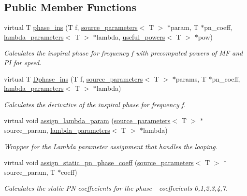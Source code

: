 \subsection*{Public Member Functions}
\begin{DoxyCompactItemize}
\item 
virtual T \hyperlink{classgIMRPhenomD_a7f4ebb4ae13d1038a437f86862f6dce1}{phase\+\_\+ins} (T f, \hyperlink{structsource__parameters}{source\+\_\+parameters}$<$ T $>$ $\ast$param, T $\ast$pn\+\_\+coeff, \hyperlink{structlambda__parameters}{lambda\+\_\+parameters}$<$ T $>$ $\ast$lambda, \hyperlink{structuseful__powers}{useful\+\_\+powers}$<$ T $>$ $\ast$pow)
\begin{DoxyCompactList}\small\item\em Calculates the inspiral phase for frequency f with precomputed powers of MF and PI for speed. \end{DoxyCompactList}\item 
virtual T \hyperlink{classgIMRPhenomD_a6099474bc9029be687ff6ede999ae5a7}{Dphase\+\_\+ins} (T f, \hyperlink{structsource__parameters}{source\+\_\+parameters}$<$ T $>$ $\ast$params, T $\ast$pn\+\_\+coeff, \hyperlink{structlambda__parameters}{lambda\+\_\+parameters}$<$ T $>$ $\ast$lambda)
\begin{DoxyCompactList}\small\item\em Calculates the derivative of the inspiral phase for frequency f. \end{DoxyCompactList}\item 
\mbox{\label{classgIMRPhenomD_a21fa3ed99dc15dfe6e3d3174f14d115d}} 
virtual void \hyperlink{classgIMRPhenomD_a21fa3ed99dc15dfe6e3d3174f14d115d}{assign\+\_\+lambda\+\_\+param} (\hyperlink{structsource__parameters}{source\+\_\+parameters}$<$ T $>$ $\ast$source\+\_\+param, \hyperlink{structlambda__parameters}{lambda\+\_\+parameters}$<$ T $>$ $\ast$lambda)
\begin{DoxyCompactList}\small\item\em Wrapper for the Lambda parameter assignment that handles the looping. \end{DoxyCompactList}\item 
\mbox{\label{classgIMRPhenomD_a6f9f182e4299198ad2ffc1eecdd41f10}} 
virtual void \hyperlink{classgIMRPhenomD_a6f9f182e4299198ad2ffc1eecdd41f10}{assign\+\_\+static\+\_\+pn\+\_\+phase\+\_\+coeff} (\hyperlink{structsource__parameters}{source\+\_\+parameters}$<$ T $>$ $\ast$source\+\_\+param, T $\ast$coeff)
\begin{DoxyCompactList}\small\item\em Calculates the static PN coeffecients for the phase -\/ coeffecients 0,1,2,3,4,7. \end{DoxyCompactList}\end{DoxyCompactItemize}


